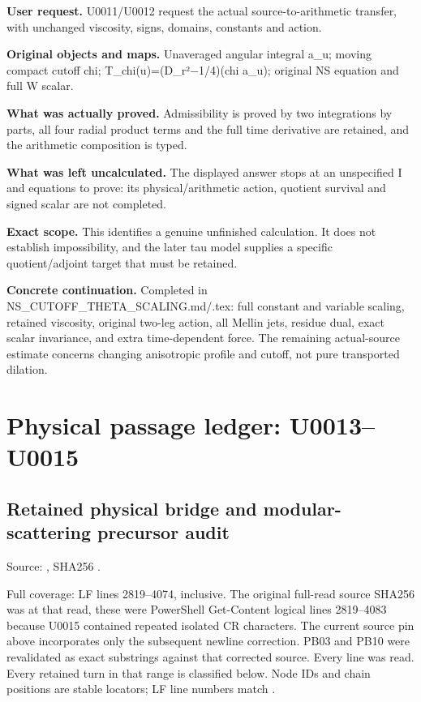 \textbf{User request.} U0011/U0012 request the actual
source-to-arithmetic transfer, with unchanged viscosity, signs, domains,
constants and action.

\textbf{Original objects and maps.} Unaveraged angular integral a\_u;
moving compact cutoff chi;
T\_chi(u)=(D\_r²\allowbreak{}\ensuremath{−}\allowbreak{}1/4)(chi a\_u);
original NS equation and full W scalar.

\textbf{What was actually proved.} Admissibility is proved by two
integrations by parts, all four radial product terms and the full time
derivative are retained, and the arithmetic composition is typed.

\textbf{What was left uncalculated.} The displayed answer stops at an
unspecified I and equations to prove: its physical/arithmetic action,
quotient survival and signed scalar are not completed.

\textbf{Exact scope.} This identifies a genuine unfinished calculation.
It does not establish impossibility, and the later tau model supplies a
specific quotient/adjoint target that must be retained.

\textbf{Concrete continuation.} Completed in
NS\_CUTOFF\_THETA\_SCALING.md/.tex: full constant and variable scaling,
retained viscosity, original two-leg action, all Mellin jets, residue
dual, exact scalar invariance, and extra time-dependent force. The
remaining actual-source estimate concerns changing anisotropic profile
and cutoff, not pure transported dilation.

\section{Physical passage ledger:
U0013--U0015}\label{TranscriptLedgerStage:physical-passage-ledger-u0013u0015}

\subsection{Retained physical bridge and modular-scattering precursor
audit}\label{TranscriptLedgerStage:retained-physical-bridge-and-modular-scattering-precursor-audit}

Source:
\protect{},
SHA256
\protect{}.

Full coverage: LF lines 2819--4074, inclusive. The original full-read
source SHA256 was
\protect{}
at that read, these were PowerShell Get-Content logical lines 2819--4083
because U0015 contained repeated isolated CR characters. The current
source pin above incorporates only the subsequent newline correction.
PB03 and PB10 were revalidated as exact substrings against that
corrected source. Every line was read. Every retained turn in that range
is classified below. Node IDs and chain positions are stable locators;
LF line numbers match \protect{}.


